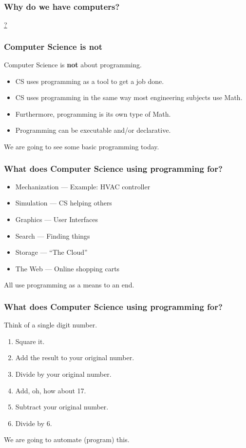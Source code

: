 \documentclass{beamer}
\begin{document}
\begin{frame}   
\frametitle{Why do we have computers?}
\Large

\begin{center}
\href{file:/Users/andy/git/github/engr108/slides/JobsBike.mov}{?}
\end{center}

\end{frame}

\begin{frame}
\frametitle{Computer Science is {\bf not}}
\Large
Computer Science is {\bf not\/} about programming.
\frameskip

\begin{itemize}
\item CS uses programming as a tool to get a job done.
\item CS uses programming in the same way most engineering subjects use Math.
\item Furthermore, programming is its own type of Math.
\item Programming can be executable and/or declarative.
\end{itemize}

\frameskip
We are going to see some basic programming today.
\end{frame}

\begin{frame}
\frametitle{What does Computer Science using {\bf programming} for?}
\Large
\begin{itemize}
\item Mechanization --- Example: HVAC controller
\item Simulation --- CS helping others
\item Graphics --- User Interfaces
\item Search --- Finding things
\item Storage --- ``The Cloud''
\item The Web --- Online shopping carts
\end{itemize}

All use programming as a means to an end.

\end{frame}

\begin{frame}
\frametitle{What does Computer Science using {\bf programming} for?}
\Large

Think of a single digit number.

\begin{enumerate}
\item Square it.
\item Add the result to your original number.
\item Divide by your original number.
\item Add, oh, how about 17.
\item Subtract your original number.
\item Divide by 6. 
\end{enumerate}

We are going to automate (program) this.

\end{frame}
\end{document}
